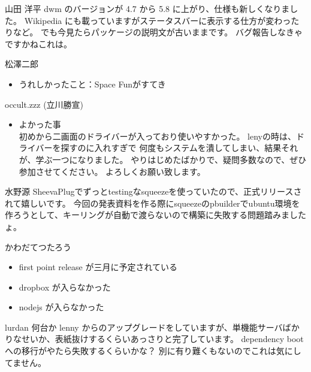 \documentclass[mingoth,a4paper]{jsarticle}
\begin{document}
\begin{prework}{ 山田 洋平 }
dwm のバージョンが 4.7 から 5.8 に上がり、仕様も新しくなりました。
Wikipedia にも載っていますがステータスバーに表示する仕方が変わったりなど。
でも今見たらパッケージの説明文が古いままです。
バグ報告しなきゃですかねこれは。
\end{prework}

\begin{prework}{ 松澤二郎 }
 \begin{itemize}
  \item うれしかったこと：Space Funがすてき
 \end{itemize}
\end{prework}

\begin{prework}{ occult.zzz (立川勝宣) }

 \begin{itemize}
  \item よかった事 \\
        初めから二画面のドライバーが入っており使いやすかった。
        lenyの時は、ドライバーを探すのに入れすぎで
        何度もシステムを潰してしまい、結果それが、学ぶ一つになりました。
        やりはじめたばかりで、疑問多数なので、ぜひ参加させてください。
        よろしくお願い致します。
 \end{itemize}
\end{prework}

\begin{prework}{ 水野源 }
SheevaPlugでずっとtestingなsqueezeを使っていたので、正式リリースされて嬉しいです。
今回の発表資料を作る際にsqueezeのpbuilderでubuntu環境を作ろうとして、キーリングが自動で渡らないので構築に失敗する問題踏みましたょ。
\end{prework}

\begin{prework}{ かわだてつたろう }
 \begin{itemize}
  \item first point release が三月に予定されている
  \item dropbox が入らなかった
  \item nodejs が入らなかった
 \end{itemize}
\end{prework}

\begin{prework}{ lurdan }
何台か lenny からのアップグレードをしていますが、単機能サーバばかりなせいか、表紙抜けするくらいあっさりと完了しています。
dependency boot への移行がやたら失敗するくらいかな？ 別に有り難くもないのでこれは気にしてません。
\end{prework}
\end{document}
